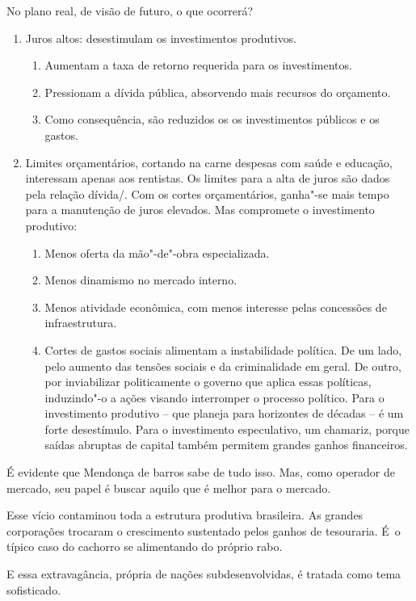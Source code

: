No plano real, de visão de futuro, o que ocorrerá?

\begin{enumerate}
\itemsep1pt\parskip0pt
\item
  Juros altos: desestimulam os investimentos produtivos.

  \begin{enumerate}
  \itemsep1pt\parskip0pt
  \item
    Aumentam a taxa de retorno requerida para os investimentos.
  \item
    Pressionam a dívida pública, absorvendo mais recursos do orçamento.
  \item
    Como consequência, são reduzidos os os investimentos públicos e os
    gastos.
  \end{enumerate}
\item
  Limites orçamentários, cortando na carne despesas com saúde e
  educação, interessam apenas aos rentistas. Os limites para a alta de
  juros são dados pela relação dívida/\allowbreak{}. Com os cortes orçamentários,
  ganha"-se mais tempo para a manutenção de juros elevados. Mas
  compromete o investimento produtivo:

  \begin{enumerate}
  \itemsep1pt\parskip0pt
  \item
    Menos oferta da mão"-de"-obra especializada.
  \item
    Menos dinamismo no mercado interno.
  \item
    Menos atividade econômica, com menos interesse pelas concessões de
    infraestrutura.
  \item
    Cortes de gastos sociais alimentam a instabilidade política. De um
    lado, pelo aumento das tensões sociais e da criminalidade em geral.
    De outro, por inviabilizar politicamente o governo que aplica essas
    políticas, induzindo"-o a ações visando interromper o processo
    político. Para o investimento produtivo -- que planeja para
    horizontes de décadas -- é um forte desestímulo. Para o investimento
    especulativo, um chamariz, porque saídas abruptas de capital também
    permitem grandes ganhos financeiros.
  \end{enumerate}
\end{enumerate}

É evidente que Mendonça de barros sabe de tudo isso. Mas, como operador
de mercado, seu papel é buscar aquilo que é melhor para o mercado.

Esse vício contaminou toda a estrutura produtiva brasileira. As grandes
corporações trocaram o crescimento sustentado pelos ganhos de
tesouraria. É~o típico caso do cachorro se alimentando do próprio rabo.

E essa extravagância, própria de nações subdesenvolvidas, é tratada como
tema sofisticado.
